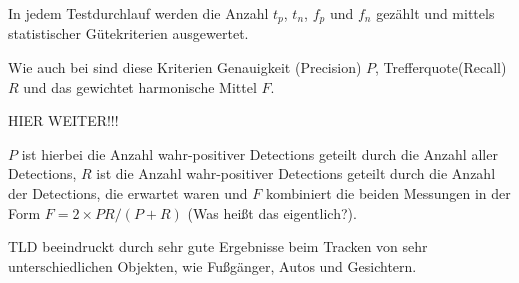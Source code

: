 	In jedem Testdurchlauf werden die Anzahl $t_p$, $t_n$, $f_p$ und $f_n$ gezählt und mittels statistischer Gütekriterien ausgewertet. 

  Wie auch bei \cite{TLD} sind diese Kriterien Genauigkeit (Precision) $P$, Trefferquote(Recall) $R$ und das gewichtet harmonische Mittel $F$.
  
  HIER WEITER!!!
	
	$P$ ist hierbei die Anzahl wahr-positiver Detections geteilt durch die Anzahl aller Detections, $R$ ist die Anzahl wahr-positiver Detections geteilt durch die Anzahl der Detections, die erwartet waren und $F$ kombiniert die beiden Messungen in der Form $F=2\times PR/(P+R)$ (Was heißt das eigentlich?).




TLD beeindruckt durch sehr gute Ergebnisse beim Tracken von sehr unterschiedlichen Objekten, wie Fußgänger, Autos und Gesichtern.

